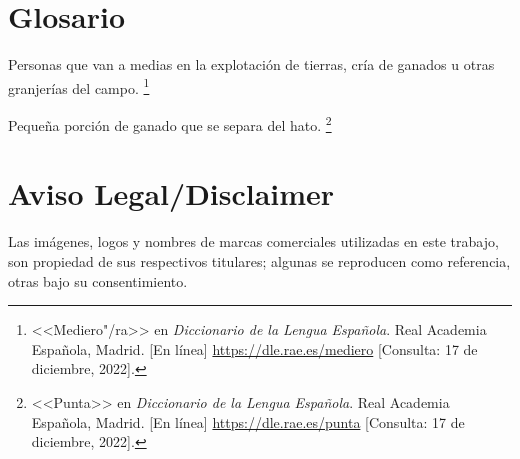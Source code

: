 \documentclass[14pt,twoside,final]{extbook} %
\let\oldfootnote\footnote
\renewcommand\footnote[1]{%
\oldfootnote{\hspace{1mm}#1}}
\begin{document}
\chapter{Glosario}\label{ap:glosario}
\thispagestyle{empty}
\pagestyle{fancy}
\fancyhf{} %
\fancyhead[RO,LE]{\thepage}
\renewcommand{\headrulewidth}{0pt}
\setcounter{page}{137}
\begin{description}[noitemsep]
\item[Medieros]Personas que van a medias en la explotación de tierras, cría de ganados u otras granjerías del campo.\footnote{<<Mediero"/ra>> en \emph{Diccionario de la Lengua Española}. Real Academia Española, Madrid. [En línea] \url{https://dle.rae.es/mediero} [Consulta: 17 de diciembre, 2022].}
\item[Punta de ganado]Pequeña porción de ganado que se separa del hato.\footnote{<<Punta>> en \emph{Diccionario de la Lengua Española}. Real Academia Española, Madrid. [En línea] \url{https://dle.rae.es/punta} [Consulta: 17 de diciembre, 2022].}
\end{description}
\chapter{Aviso Legal/Disclaimer}\label{ap:aviso-legal-disclaimer}
\thispagestyle{empty}
\pagestyle{fancy}
\fancyhf{} %
\fancyhead[RO,LE]{\thepage}
\renewcommand{\headrulewidth}{0pt}
\setcounter{page}{139}
\renewcommand{\TeX}{T\kern -.1267em\lower .35ex\hbox {E}\kern -.105emX} %
\renewcommand{\LaTeX}{L\kern-.275em\raisebox{.5ex}{\textsc{a}}\kern-.1em\hbox{\TeX}} %
\renewcommand{\LaTeXe}{L\kern-.275em\raisebox{.5ex}{\textsc{a}}\kern-.1em\hbox{\TeX} \hbox{2}\kern-.03em\raisebox{-.4ex}{\fontencoding{LGR}\selectfont\char 101}} %
Las imágenes, logos y nombres de marcas comerciales utilizadas en este trabajo, son propiedad de sus respectivos titulares; algunas se reproducen como referencia, otras bajo su consentimiento. \\
\end{document}
